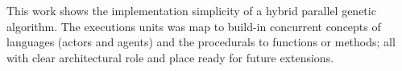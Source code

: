 
This work shows the implementation simplicity of a hybrid parallel genetic algorithm. The executions units was map to build-in concurrent concepts of languages (actors and agents) and the procedurals to functions or methods; all with clear architectural role and place ready for future extensions.




